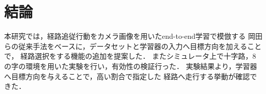 \chapter{結論}

本研究では，経路追従行動をカメラ画像を用いたend-to-end学習で模倣する
岡田ら\cite{okada}の従来手法をベースに，データセットと学習器の入力へ目標方向を加えることで，
経路選択をする機能の追加を提案した．
またシミュレータ上で十字路，8の字の環境を用いた実験を行い，有効性の検証行った．
実験結果より，学習器へ目標方向を与えることで，高い割合で指定した
経路へ走行する挙動が確認できた．